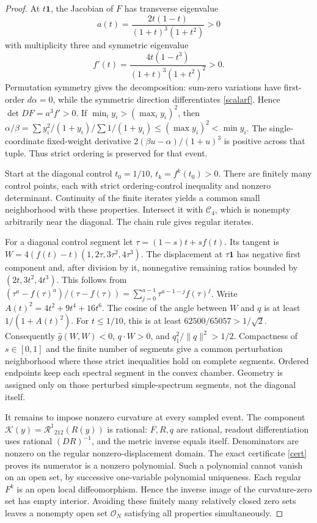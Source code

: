 \documentclass[11pt,letterpaper]{article}
\theoremstyle{definition}
\numberwithin{equation}{section}
\begin{document}
\begin{proof}
At $t\mathbf1$, the Jacobian of $F$ has transverse eigenvalue
\begin{equation}
a(t)=\frac{2t(1-t)}{(1+t)^3(1+t^2)}>0
\end{equation}
with multiplicity three and symmetric eigenvalue
\begin{equation}
f'(t)=\frac{4t(1-t^3)}{(1+t)^3(1+t^2)^2}>0.
\end{equation}
Permutation symmetry gives the decomposition: sum-zero variations have first-order $d\alpha=0$, while the symmetric direction differentiates \eqref{scalarf}. Hence $\det DF=a^3f'>0$. If $\min_i y_i>(\max_i y_i)^2$, then
$\alpha/\beta=\sum y_i^2/(1+y_i)\big/\sum1/(1+y_i)\leq(\max y_i)^2<\min y_i$.
The single-coordinate fixed-weight derivative $2(\beta u-\alpha)/(1+u)^3$ is positive across that tuple. Thus strict ordering is preserved for that event.

Start at the diagonal control $t_0=1/10$, $t_k=f^k(t_0)>0$. There are finitely many control points, each with strict ordering-control inequality and nonzero determinant. Continuity of the finite iterates yields a common small neighborhood with these properties. Intersect it with $\mathcal C_4$, which is nonempty arbitrarily near the diagonal. The chain rule gives regular iterates.

For a diagonal control segment let $\tau=(1-s)t+sf(t)$. Its tangent is $W=4(f(t)-t)(1,2\tau,3\tau^2,4\tau^3)$. The displacement at $\tau\mathbf1$ has negative first component and, after division by it, nonnegative remaining ratios bounded by $(2t,3t^2,4t^3)$. This follows from $(\tau^a-f(\tau)^a)/(\tau-f(\tau))=\sum_{j=0}^{a-1}\tau^{a-1-j}f(\tau)^j$. Write $A(t)^2=4t^2+9t^4+16t^6$. The cosine of the angle between $W$ and $q$ is at least $1/(1+A(t)^2)$. For $t\leq1/10$, this is at least $62500/65057>1/\sqrt2$. Consequently $\widehat g(W,W)<0$, $q\cdot W>0$, and $q_1^2/\|q\|^2>1/2$. Compactness of $s\in[0,1]$ and the finite number of segments give a common perturbation neighborhood where these strict inequalities hold on complete segments. Ordered endpoints keep each spectral segment in the convex chamber. Geometry is assigned only on those perturbed simple-spectrum segments, not the diagonal itself.

It remains to impose nonzero curvature at every sampled event. The component $\mathcal K(y)=\mathcal R^1{}_{212}(R(y))$ is rational: $F,R,q$ are rational, readout differentiation uses rational $(DR)^{-1}$, and the metric inverse equals itself. Denominators are nonzero on the regular nonzero-displacement domain. The exact certificate \eqref{cert} proves its numerator is a nonzero polynomial. Such a polynomial cannot vanish on an open set, by successive one-variable polynomial uniqueness. Each regular $F^k$ is an open local diffeomorphism. Hence the inverse image of the curvature-zero set has empty interior. Avoiding these finitely many relatively closed zero sets leaves a nonempty open set $\mathcal O_N$ satisfying all properties simultaneously.
\end{proof}
\end{document}
